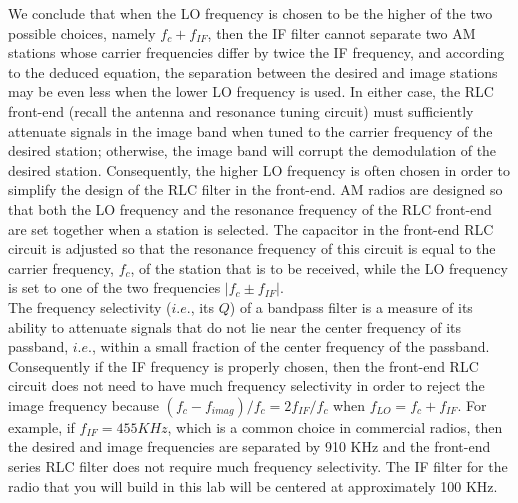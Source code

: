 \documentclass{article}
\begin{document}
We conclude that when the LO frequency is chosen to be the higher of the two possible choices, namely $f_c + f_{IF}$, then the IF filter cannot separate two AM stations whose carrier frequencies differ by twice the IF frequency, and according to the deduced equation, the separation between the desired and image stations may be even less when the lower LO frequency is used. In either case, the RLC front-end (recall the antenna and resonance tuning circuit) must sufficiently attenuate signals in the image band when tuned to the carrier frequency of the desired station; otherwise, the image band will corrupt the demodulation of the desired station. Consequently, the higher LO frequency is often chosen in order to simplify the design of the RLC filter in the front-end. AM radios are designed so that both the LO frequency and the resonance frequency of the RLC front-end are set together when a station is selected. The capacitor in the front-end RLC circuit is adjusted so that the resonance frequency of this circuit is equal to the carrier frequency, $f_c$, of the station that is to be received, while the LO frequency is set to one of the two frequencies $|f_c \pm f_{IF} |$.\\
The frequency selectivity ($i.e.$, its $Q$) of a bandpass filter is a measure of its ability to attenuate signals that do not lie near the center frequency of its passband, $i.e.$, within a small fraction of the center frequency of the passband. Consequently if the IF frequency is properly chosen, then the front-end RLC circuit does not need to have much frequency selectivity in order to reject the image frequency because $(f_c-f_{imag})/f_c = 2f_{IF}/f_c$ when $f_{LO} = f_c + f_{IF}$. For example, if $f_{IF}= 455 KHz$, which is a common choice in commercial radios, then the desired and image frequencies are separated by 910 KHz and the front-end series RLC filter does not require much frequency selectivity. The IF filter for the radio that you will build in this lab will be centered at approximately 100 KHz.
\end{document}
